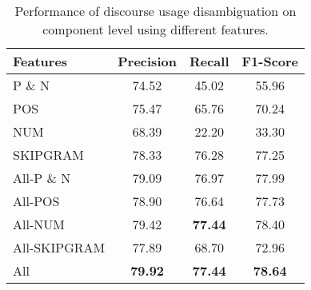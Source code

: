 \begin{table}[ht]
\centering
\begin{tabular}{|l|c|c|c|}
\hline

    Features        &     Precision &     Recall &     F1-Score \\ \hline
    P \& N          &     74.52     &     45.02  &     55.96    \\ \hline
    POS             &     75.47     &     65.76  &     70.24    \\ \hline
    NUM             &     68.39     &     22.20  &     33.30    \\ \hline
    SKIPGRAM        &     78.33     &     76.28  &     77.25    \\ \hline
    All-P \& N      &     79.09     &     76.97  &     77.99    \\ \hline
    All-POS         &     78.90     &     76.64  &     77.73    \\ \hline
    All-NUM         &     79.42     & \bf 77.44  &     78.40    \\ \hline
    All-SKIPGRAM    &     77.89     &     68.70  &     72.96    \\ \hline
    All             & \bf 79.92     & \bf 77.44  & \bf 78.64    \\ \hline


\end{tabular}
\caption{\label{t:recognition-features} Performance of discourse usage
disambiguation on component level using different features. }
\end{table}
